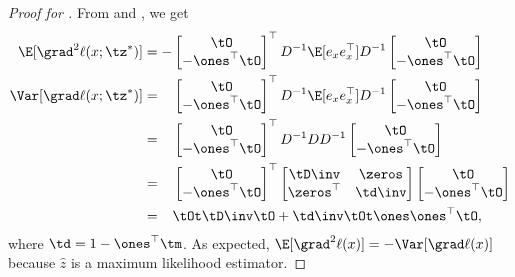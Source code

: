 \begin{proof}[Proof for ]
From  and , we get
  \begin{align*}
    \E[\grad^2 \ell(x; \tz^*)] 
    &= -
        \begin{bmatrix}
          \tO \\
          -\ones^\top \tO
        \end{bmatrix}^\top
          D^{-1} \E[e_x e_x^\top] D^{-1} 
        \begin{bmatrix}
          \tO \\
          -\ones^\top \tO
        \end{bmatrix} \\
    \Var [\grad \ell(x; \tz^*)] 
    &= \hphantom{-}
        \begin{bmatrix}
          \tO \\
          -\ones^\top \tO
        \end{bmatrix}^\top
          D^{-1} \E[e_x e_x^\top] D^{-1} 
        \begin{bmatrix}
          \tO \\
          -\ones^\top \tO
        \end{bmatrix} \\
    &= \hphantom{-}
        \begin{bmatrix}
          \tO \\
          -\ones^\top \tO
        \end{bmatrix}^\top
          D^{-1} D D^{-1} 
        \begin{bmatrix}
          \tO \\
          -\ones^\top \tO
        \end{bmatrix} \\
    &= \hphantom{-}
        \begin{bmatrix}
          \tO \\
          - \ones^\top \tO
        \end{bmatrix}^\top
        \begin{bmatrix}
          \tD\inv & \zeros \\
          \zeros^\top & \td\inv
        \end{bmatrix}
        \begin{bmatrix}
          \tO \\
          - \ones^\top \tO
        \end{bmatrix} \\
        &= \hphantom{-} 
          \tOt \tD\inv \tO + \td\inv \tOt \ones \ones^\top \tO,
  \end{align*}
where $\td = 1 - \ones^\top \tm$.
As expected, $\E[\grad^2 \ell(x)] = -\Var [\grad \ell(x)]$ because
$\hat{z}$ is a maximum likelihood estimator. 


\end{proof}
